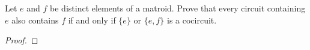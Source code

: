 \prob
{
    Let $e$ and $f$ be distinct elements of a matroid. Prove that every circuit containing $e$ also contains $f$ if and only if 
    $\{e\}$ or $\{e, f\}$ is a cocircuit.
}
\begin{proof}
\end{proof}